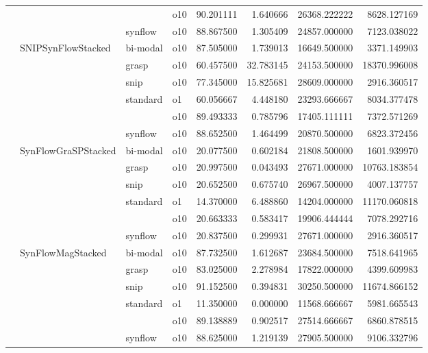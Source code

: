 \begin{longtable}{llllrrrr}
      &     &         & o10 &  90.201111 &   1.640666 &     26368.222222 &   8628.127169 \\
      &     & synflow & o10 &  88.867500 &   1.305409 &     24857.000000 &   7123.038022 \\
      & SNIPSynFlowStacked & bi-modal & o10 &  87.505000 &   1.739013 &     16649.500000 &   3371.149903 \\
      &     & grasp & o10 &  60.457500 &  32.783145 &     24153.500000 &  18370.996008 \\
      &     & snip & o10 &  77.345000 &  15.825681 &     28609.000000 &   2916.360517 \\
      &     & standard & o1 &  60.056667 &   4.448180 &     23293.666667 &   8034.377478 \\
      &     &         & o10 &  89.493333 &   0.785796 &     17405.111111 &   7372.571269 \\
      &     & synflow & o10 &  88.652500 &   1.464499 &     20870.500000 &   6823.372456 \\
      & SynFlowGraSPStacked & bi-modal & o10 &  20.077500 &   0.602184 &     21808.500000 &   1601.939970 \\
      &     & grasp & o10 &  20.997500 &   0.043493 &     27671.000000 &  10763.183854 \\
      &     & snip & o10 &  20.652500 &   0.675740 &     26967.500000 &   4007.137757 \\
      &     & standard & o1 &  14.370000 &   6.488860 &     14204.000000 &  11170.060818 \\
      &     &         & o10 &  20.663333 &   0.583417 &     19906.444444 &   7078.292716 \\
      &     & synflow & o10 &  20.837500 &   0.299931 &     27671.000000 &   2916.360517 \\
      & SynFlowMagStacked & bi-modal & o10 &  87.732500 &   1.612687 &     23684.500000 &   7518.641965 \\
      &     & grasp & o10 &  83.025000 &   2.278984 &     17822.000000 &   4399.609983 \\
      &     & snip & o10 &  91.152500 &   0.394831 &     30250.500000 &  11674.866152 \\
      &     & standard & o1 &  11.350000 &   0.000000 &     11568.666667 &   5981.665543 \\
      &     &         & o10 &  89.138889 &   0.902517 &     27514.666667 &   6860.878515 \\
      &     & synflow & o10 &  88.625000 &   1.219139 &     27905.500000 &   9106.332796 \\

\end{longtable}

